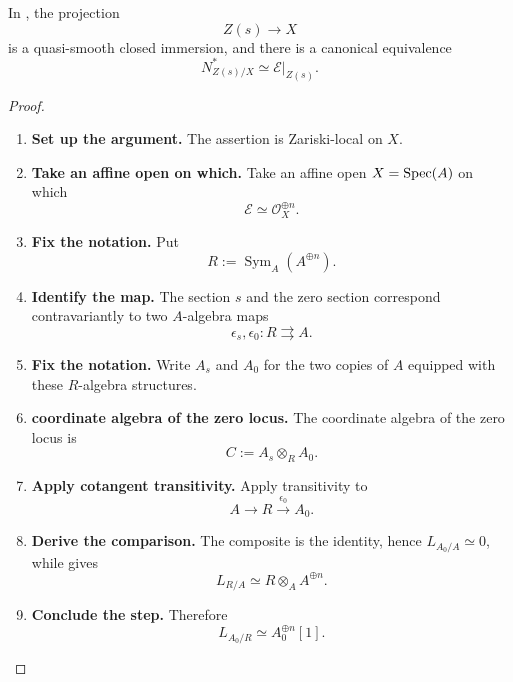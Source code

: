 \begin{theorem}
\label{thm:derived-zero-locus-quasi-smooth}
In , the projection
\[
    Z(s)\longrightarrow X
\]
is a quasi-smooth closed immersion, and there is a canonical equivalence
\[
    N^*_{Z(s)/X}
    \simeq
    \mathcal E|_{Z(s)}.
\]
\end{theorem}

\begin{proof}
\leavevmode
\begin{enumerate}[label=\textup{(\arabic*)}]
    \item \textbf{Set up the argument.}
    The assertion is Zariski-local on \(X\).

    \item \textbf{Take an affine open on which.}
    Take an affine open \(X=\operatorname{Spec}(A)\) on which
    \[
        \mathcal E\simeq\mathcal O_X^{\oplus n}.
    \]

    \item \textbf{Fix the notation.}
    Put
    \[
        R:=\operatorname{Sym}_A(A^{\oplus n}).
    \]

    \item \textbf{Identify the map.}
    The section \(s\) and the zero section correspond contravariantly to two
    \(A\)-algebra maps
    \[
        \epsilon_s,\epsilon_0:R\rightrightarrows A.
    \]

    \item \textbf{Fix the notation.}
    Write \(A_s\) and \(A_0\) for the two copies of \(A\) equipped with these
    \(R\)-algebra structures.

    \item \textbf{coordinate algebra of the zero locus.}
    The coordinate algebra of the zero locus is
    \[
        C:=A_s\otimes_RA_0.
    \]

    \item \textbf{Apply cotangent transitivity.}
    Apply transitivity to
    \[
        A\longrightarrow R\xrightarrow{\epsilon_0}A_0.
    \]

    \item \textbf{Derive the comparison.}
    The composite is the identity, hence \(L_{A_0/A}\simeq0\), while 
    gives
    \[
        L_{R/A}\simeq R\otimes_AA^{\oplus n}.
    \]

    \item \textbf{Conclude the step.}
    Therefore
    \[
        L_{A_0/R}
        \simeq
        A_0^{\oplus n}[1].
    \]


\end{enumerate}
\end{proof}
